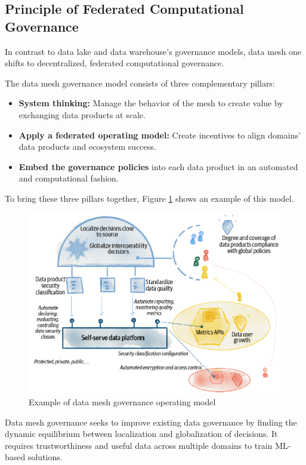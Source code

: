 \documentclass[12pt, a4paper]{book}
\begin{document}
\subsection{Principle of Federated Computational Governance}
In contrast to data lake and data warehouse's governance models, data mesh one shifts to decentralized, federated computational governance.

The data mesh governance model consists of three complementary pillars:
	\begin{itemize}[nosep]
		\item \textbf{System thinking:} Manage the behavior of the mesh to create value by exchanging data products at scale.
		\item \textbf{Apply a federated operating model:} Create incentives to align domains' data products and ecosystem success.
		\item \textbf{Embed the governance policies} into each data product in an automated and computational fashion. 
	\end{itemize}

To bring these three pillars together, Figure \ref{DataGov} shows an example of this model.

\begin{figure}[h]
	\begin{framed}
		\centering
		\includegraphics[width=12cm]{DataGov.png}
		\caption{Example of data mesh governance operating model}
		\label{DataGov}
	\end{framed}
\end{figure}

Data mesh governance seeks to improve existing data governance by finding the dynamic equilibrium between localization and globalization of decisions. It requires trustworthiness and useful data across multiple domains to train ML-based solutions.
\end{document}
